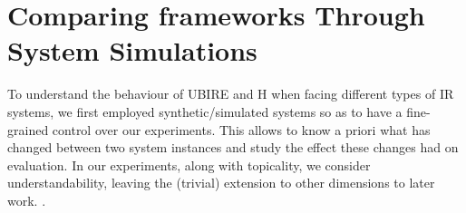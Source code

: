 



\section{Comparing frameworks Through System Simulations}
\label{sec:simulations}


To understand the behaviour of UBIRE and H when facing different types of IR systems, we first employed synthetic/simulated systems so as to have a fine-grained control over our experiments. This allows to know a priori what has changed between two system instances and study the effect these changes had on evaluation. In our experiments, along with topicality, we consider understandability, leaving the (trivial) extension to other dimensions to later work. .




%

